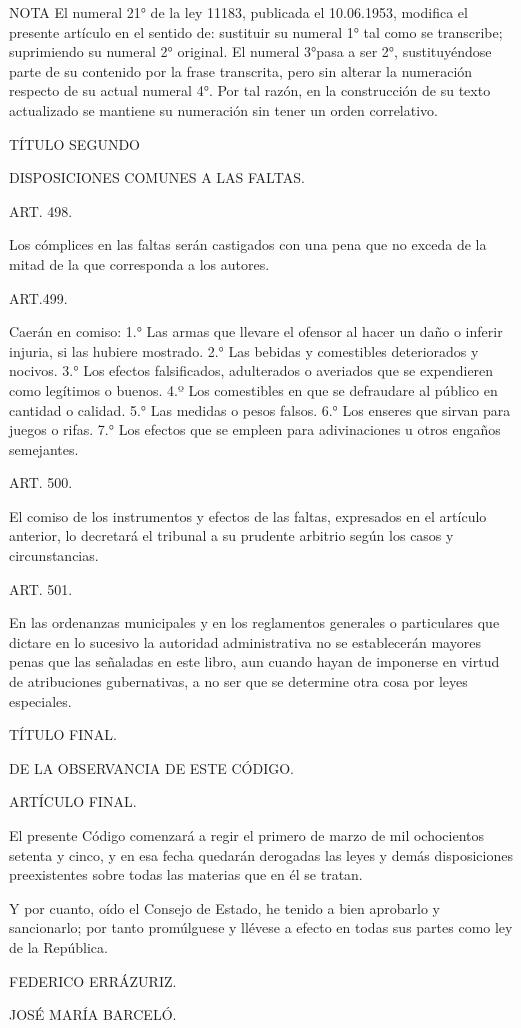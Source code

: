 NOTA
      El numeral 21° de la ley 11183, publicada el 10.06.1953, modifica el presente artículo en el sentido de: sustituir su numeral 1° tal como se transcribe; suprimiendo su numeral 2° original. El numeral 3°pasa a ser 2°, sustituyéndose parte de su contenido por la frase transcrita, pero sin alterar la numeración respecto de su actual numeral 4°. Por tal razón, en la construcción de su texto actualizado se mantiene su numeración sin tener un orden correlativo.

    TÍTULO SEGUNDO

    DISPOSICIONES COMUNES A LAS FALTAS.





    ART. 498.

    Los cómplices en las faltas serán castigados con una pena que no exceda de la mitad de la que corresponda a los autores.


    ART.499.

    Caerán en comiso:
    1.° Las armas que llevare el ofensor al hacer un daño o inferir injuria, si las hubiere mostrado.
    2.° Las bebidas y comestibles deteriorados y nocivos.
    3.° Los efectos falsificados, adulterados o averiados que se expendieren como legítimos o buenos.
    4.º Los comestibles en que se defraudare al público en cantidad o calidad.
    5.° Las medidas o pesos falsos.
    6.° Los enseres que sirvan para juegos o rifas.
    7.° Los efectos que se empleen para adivinaciones u otros engaños semejantes.


    ART. 500.

    El comiso de los instrumentos y efectos de las faltas, expresados en el artículo anterior, lo decretará el tribunal a su prudente arbitrio según los casos y circunstancias.



    ART. 501.

    En las ordenanzas municipales y en los reglamentos generales o particulares que dictare en lo sucesivo la autoridad administrativa no se establecerán mayores penas que las señaladas en este libro, aun cuando hayan de imponerse en virtud de atribuciones gubernativas, a no ser que se determine otra cosa por leyes especiales.


    TÍTULO FINAL.

    DE LA OBSERVANCIA DE ESTE CÓDIGO.





    ARTÍCULO FINAL.

    El presente Código comenzará a regir el primero de marzo de mil ochocientos setenta y cinco, y en esa fecha quedarán derogadas las leyes y demás disposiciones preexistentes sobre todas las materias que en él se tratan.


    Y por cuanto, oído el Consejo de Estado, he tenido a bien aprobarlo y sancionarlo; por tanto promúlguese y llévese a efecto en todas sus partes como ley de la República.

    FEDERICO ERRÁZURIZ.

    JOSÉ MARÍA BARCELÓ.
